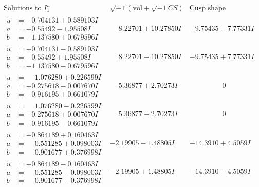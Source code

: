 \documentclass[1p]{elsarticle_modified}
\theoremstyle{definition}
\newcommand{\I}{\sqrt{-1}}
\begin{document}
$$\begin{array}{c|c|c}  
\text{Solutions to }I^u_{1}& \I (\text{vol} + \sqrt{-1}CS) & \text{Cusp shape}\\
 \hline 
\begin{aligned}
u &= -0.704131 + 0.589103 I \\
a &= -0.55492 - 1.95508 I \\
b &= -1.137580 + 0.679596 I\end{aligned}
 & \phantom{-}8.22701 + 10.27850 I & -9.75435 - 7.77331 I \\ \hline\begin{aligned}
u &= -0.704131 - 0.589103 I \\
a &= -0.55492 + 1.95508 I \\
b &= -1.137580 - 0.679596 I\end{aligned}
 & \phantom{-}8.22701 - 10.27850 I & -9.75435 + 7.77331 I \\ \hline\begin{aligned}
u &= \phantom{-}1.076280 + 0.226599 I \\
a &= -0.275618 - 0.007670 I \\
b &= -0.916195 + 0.661079 I\end{aligned}
 & \phantom{-}5.36877 + 2.70273 I & \phantom{-0.000000 } 0 \\ \hline\begin{aligned}
u &= \phantom{-}1.076280 - 0.226599 I \\
a &= -0.275618 + 0.007670 I \\
b &= -0.916195 - 0.661079 I\end{aligned}
 & \phantom{-}5.36877 - 2.70273 I & \phantom{-0.000000 } 0 \\ \hline\begin{aligned}
u &= -0.864189 + 0.160463 I \\
a &= \phantom{-}0.551285 + 0.098003 I \\
b &= \phantom{-}0.901677 + 0.376998 I\end{aligned}
 & -2.19905 - 1.48805 I & -14.3910 + 4.5059 I \\ \hline\begin{aligned}
u &= -0.864189 - 0.160463 I \\
a &= \phantom{-}0.551285 - 0.098003 I \\
b &= \phantom{-}0.901677 - 0.376998 I\end{aligned}
 & -2.19905 + 1.48805 I & -14.3910 - 4.5059 I \\ \hline\begin{aligned}

\end{aligned}
\end{array}$$
\end{document}
